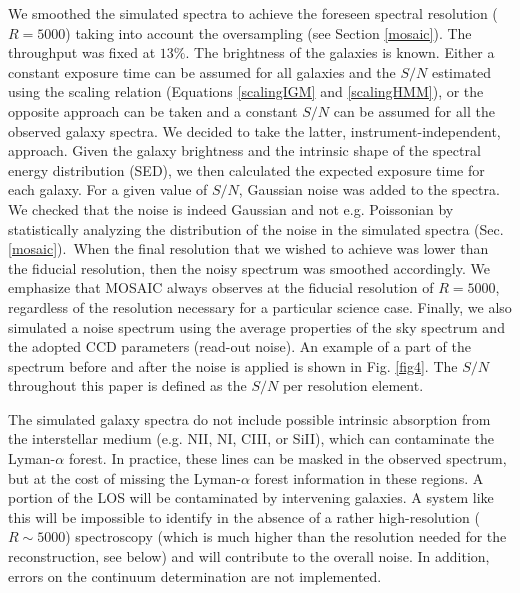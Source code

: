 \documentclass{aa}
\begin{document}
We smoothed the simulated spectra to achieve the foreseen spectral resolution ($R = 5000$) taking into account the oversampling (see Section \ref{mosaic}). The throughput was fixed at $13 \%$. The brightness of the galaxies is known. Either a constant exposure time can be assumed for all galaxies and the $S/N$ estimated using the scaling relation (Equations \ref{scalingIGM} and \ref{scalingHMM}), or the opposite approach can be taken and a constant $S/N$ can be assumed for all the observed galaxy spectra. We decided to take the latter, instrument-independent, approach. Given the galaxy brightness and the intrinsic shape of the spectral energy distribution (SED), we then calculated the expected exposure time for each galaxy. For a given value of $S/N$, Gaussian noise was added to the spectra. We checked that the noise is indeed Gaussian and not e.g. Poissonian by statistically analyzing the distribution of the noise in the simulated spectra (Sec. \ref{mosaic}).~When the final resolution that we wished to achieve was lower than the fiducial resolution, then the noisy spectrum was smoothed accordingly. We emphasize that MOSAIC always observes at the fiducial resolution of $R=5000$, regardless of the resolution necessary for a particular science case. Finally, we also simulated a noise spectrum using the average properties of the sky spectrum and the adopted CCD parameters (read-out noise). An example of a part of the spectrum before and after the noise is applied is shown in Fig. \ref{fig4}. The $S/N$ throughout this paper is defined as the $S/N$ per resolution element.

The simulated galaxy spectra do not include possible intrinsic absorption from the interstellar medium (e.g. NII, NI, CIII, or SiII), which can contaminate the Lyman-$\alpha$ forest. In practice, these lines can be masked in the observed spectrum, but at the cost of missing the Lyman-$\alpha$ forest information in these regions. A portion of the LOS will be contaminated by intervening galaxies. A system like this will be impossible to identify in the absence of a rather high-resolution ($R \sim 5000$) spectroscopy (which is much higher than the resolution needed for the reconstruction, see below) and will contribute to the overall noise. In addition, errors on the continuum determination are not implemented.
\end{document}

